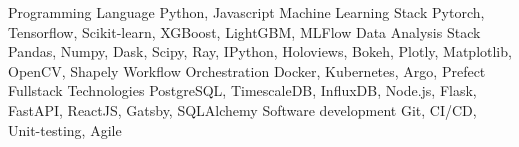 

\begin{cvskills}

  \cvskill
    {Programming Language}   
    {Python, Javascript}
  \cvskill
    {Machine Learning Stack}   
    {Pytorch, Tensorflow, Scikit-learn, XGBoost, LightGBM, MLFlow}
  \cvskill
    {Data Analysis Stack}   
    {Pandas, Numpy, Dask, Scipy, Ray, IPython, Holoviews, Bokeh, Plotly, Matplotlib, OpenCV, Shapely}
  \cvskill
    {Workflow Orchestration}
    {Docker, Kubernetes, Argo, Prefect}
  \cvskill
    {Fullstack Technologies}   
    {PostgreSQL, TimescaleDB, InfluxDB, Node.js, Flask, FastAPI, ReactJS, Gatsby, SQLAlchemy}
  \cvskill
    {Software development}   
    {Git, CI/CD, Unit-testing, Agile}
\end{cvskills}
